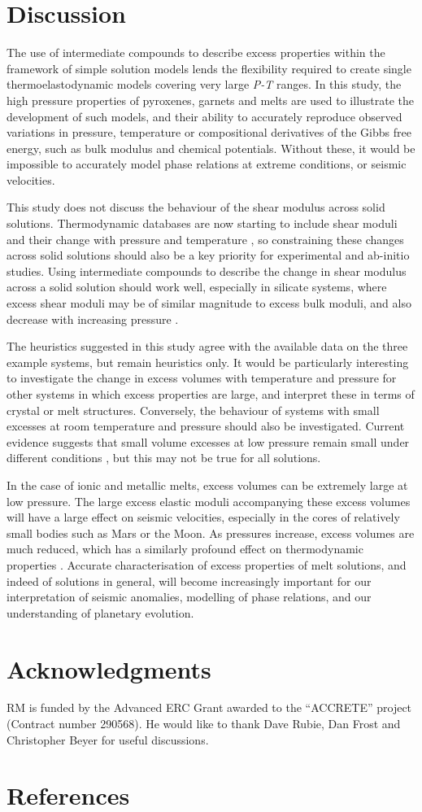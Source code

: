 \documentclass[review]{elsarticle}
\begin{document}
\section{Discussion}
The use of intermediate compounds to describe excess properties within the framework of simple solution models lends the flexibility required to create single thermoelastodynamic models covering very large \emph{P-T} ranges. In this study, the high pressure properties of pyroxenes, garnets and melts are used to illustrate the development of such models, and their ability to accurately reproduce observed variations in pressure, temperature or compositional derivatives of the Gibbs free energy, such as bulk modulus and chemical potentials. Without these, it would be impossible to accurately model phase relations at extreme conditions, or seismic velocities.

This study does not discuss the behaviour of the shear modulus across solid solutions. Thermodynamic databases are now starting to include shear moduli and their change with pressure and temperature \citep{SLB2011}, so constraining these changes across solid solutions should also be a key priority for experimental and ab-initio studies. Using intermediate compounds to describe the change in shear modulus across a solid solution should work well, especially in silicate systems, where excess shear moduli may be of similar magnitude to excess bulk moduli, and also decrease with increasing pressure \citep[e.g][]{LEDD2014}.

The heuristics suggested in this study agree with the available data on the three example systems, but remain heuristics only. It would be particularly interesting to investigate the change in excess volumes with temperature and pressure for other systems in which excess properties are large, and interpret these in terms of crystal or melt structures. Conversely, the behaviour of systems with small excesses at room temperature and pressure should also be investigated. Current evidence suggests that small volume excesses at low pressure remain small under different conditions \citep{FXMLX2015, HC2014}, but this may not be true for all solutions.

In the case of ionic and metallic melts, excess volumes can be extremely large at low pressure. The large excess elastic moduli accompanying these excess volumes will have a large effect on seismic velocities, especially in the cores of relatively small bodies such as Mars or the Moon. As pressures increase, excess volumes are much reduced, which has a similarly profound effect on thermodynamic properties \citep{Frostetal2010, DKS2013}. Accurate characterisation of excess properties of melt solutions, and indeed of solutions in general, will become increasingly important for our interpretation of seismic anomalies, modelling of phase relations, and our understanding of planetary evolution. 


\section{Acknowledgments}
RM is funded by the Advanced ERC Grant awarded to the ``ACCRETE'' project (Contract number 290568). He would like to thank Dave Rubie, Dan Frost and Christopher Beyer for useful discussions.
\clearpage
\section*{References}


\end{document}
